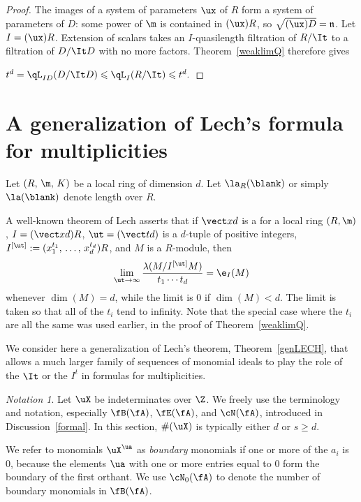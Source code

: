 \documentclass[12pt]{amsart}
\theoremstyle{plain}
\theoremstyle{remark}
\newtheorem{notation}[theorem]{Notation}
\theoremstyle{definition}
\numberwithin{equation}{theorem}
\renewcommand{\geq}{\geqslant} \renewcommand{\leq}{\leqslant}
\begin{document}
\begin{proof}
The images of a system of parameters $\ux$ of $R$ form a system
of parameters of $D$: some power of $\m$ is contained in $(\ux)R$,
so $\sqrt{(\ux)D}=\mathfrak n$. Let $I = (\ux)R$. Extension of scalars takes an
$I$-quasilength filtration of $R/\It$ to a filtration of
$D/\It D$ with no more factors. Theorem~\ref{weaklimQ} therefore gives \vspace*{7pt}

\hspace*{1.4in} {$t^d=\qL_{ID}(D/\It D)\leq\qL_I(R/\It)\leq t^d.$} \end{proof}

\section{A generalization of Lech's formula for multiplicities}\label{lechdiscussion}

Let $(R,\,\m,\,K)$ be a local ring of dimension $d$. Let $\la_R(\blank)$ 
or simply $\la(\blank)$ 
denote length over $R$. 

A well-known theorem of Lech \cite[Theorem~11.2.10]{SwHu06} asserts that if 
$\vect xd$ is a \sop for a local ring $(R, \m)$, 
$I = (\vect xd)R$, $\ut = (\vect t d)$ is a $d$-tuple of positive 
integers, $I^{[\ut]} := (x_1^{t_1},\, \ldots, \, x_d^{t_d})R$, and
$M$ is a \fg  $R$-module, 
then
\[ \lim_{\ut \to \infty} \frac{\lambda(M/I^{[\ut]}M)}{t_1\cdots t_d} = \e_I(M)\]
whenever $\dim(M) =d$, while 
the limit is 0 if $\dim(M) <d$.  
The limit is taken so that all of the
$t_i$ tend to infinity. Note that the special case where the $t_i$ are all the same
was used earlier, in the proof of Theorem~\ref{weaklimQ}.


We consider here a generalization of Lech's theorem, Theorem~\ref{genLECH},
that allows a much larger family of sequences of monomial ideals to play the 
role of the  $\It$ or the $I^t$ in formulas for multiplicities.

\begin{notation} Let $\uX$ be indeterminates over $\Z$. We freely 
use the terminology and notation, especially $\fB(\fA)$, $\fE(\fA)$, and 
$\cN(\fA)$,  introduced in Discussion~\ref{formal}.
In this section, $\#(\uX)$ is typically either $d$ or
$s \geq d$. \smallskip

We refer to monomials $\uX^{\ua}$ as 
{\it boundary} monomials if one or more of the $a_i$ is 0, because the 
elements $\ua$ with one or more entries equal to 0 form the boundary of the first
orthant. We use $\cN_0(\fA)$ to denote the number of boundary monomials in $\fB(\fA)$.
\end{notation}
\end{document}

